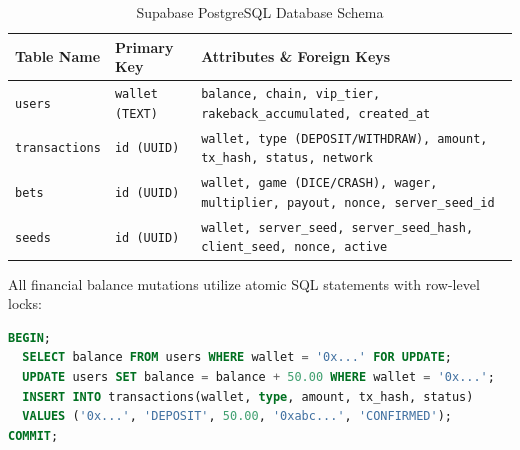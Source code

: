 \begin{table}[h!]
\centering
\renewcommand{\arraystretch}{1.2}
\begin{tabularx}{\textwidth}{@{} l l X @{}}
\toprule
\textbf{Table Name} & \textbf{Primary Key} & \textbf{Attributes \& Foreign Keys} \\
\midrule
\texttt{users} & \texttt{wallet (TEXT)} & \texttt{balance, chain, vip\_tier, rakeback\_accumulated, created\_at} \\
\texttt{transactions} & \texttt{id (UUID)} & \texttt{wallet, type (DEPOSIT/WITHDRAW), amount, tx\_hash, status, network} \\
\texttt{bets} & \texttt{id (UUID)} & \texttt{wallet, game (DICE/CRASH), wager, multiplier, payout, nonce, server\_seed\_id} \\
\texttt{seeds} & \texttt{id (UUID)} & \texttt{wallet, server\_seed, server\_seed\_hash, client\_seed, nonce, active} \\
\bottomrule
\end{tabularx}
\caption{Supabase PostgreSQL Database Schema}
\end{table}

All financial balance mutations utilize atomic SQL statements with row-level locks:
\begin{lstlisting}[language=SQL,caption={Atomic Balance Mutation with Row-Level Lock}]
BEGIN;
  SELECT balance FROM users WHERE wallet = '0x...' FOR UPDATE;
  UPDATE users SET balance = balance + 50.00 WHERE wallet = '0x...';
  INSERT INTO transactions(wallet, type, amount, tx_hash, status)
  VALUES ('0x...', 'DEPOSIT', 50.00, '0xabc...', 'CONFIRMED');
COMMIT;
\end{lstlisting}
